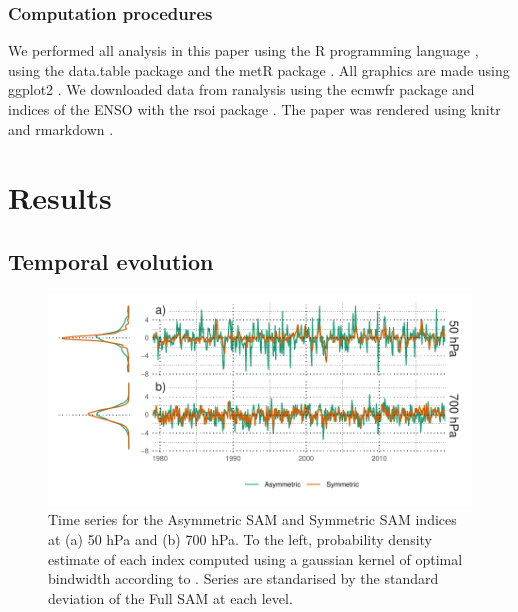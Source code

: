 \documentclass[]{ametsocV5}
\begin{document}
\subsubsection{Computation procedures}

We performed all analysis in this paper using the R programming language
\citep{rcoreteam2020}, using the data.table package \citep{dowle2020}
and the metR package \citep{campitelli2020}. All graphics are made using
ggplot2 \citep{wickham2009}. We downloaded data from ranalysis using the
ecmwfr package \citep{hufkens2020} and indices of the ENSO with the rsoi
package \citep{albers2020}. The paper was rendered using knitr and
rmarkdown \citep{xie2015, allaire2019}.

\section{Results}

\label{sec:results}

\subsection{Temporal evolution}

\label{sec:temporal}

\begin{figure}
\includegraphics{asymsam-timeseries-1} \caption[Time series for the Asymmetric SAM and Symmetric SAM indices at (a) 50 hPa and (b) 700 hPa]{Time series for the Asymmetric SAM and Symmetric SAM indices at (a) 50 hPa and (b) 700 hPa. To the left, probability density estimate of each index computed using a gaussian kernel of optimal bindwidth according to \cite{sheather1991}. Series are standarised by the standard deviation of the Full SAM at each level.}\label{fig:asymsam-timeseries}
\end{figure}
\end{document}
